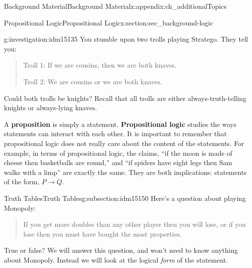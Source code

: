 \documentclass[oneside,10pt,]{book}
\newcommand{\terminology}[1]{\textbf{#1}}
\numberwithin{equation}{chapter}
\def\imp{\rightarrow}
\begin{document}
\begin{appendixptx}{Background Material}{}{Background Material}{}{}{x:appendix:ch_additionalTopics}
\typeout{************************************************}
%
\begin{sectionptx}{Propositional Logic}{}{Propositional Logic}{}{}{x:section:sec_background-logic}
\begin{introduction}{}%
\begin{investigation}{}{g:investigation:idm15135}%
You stumble upon two trolls playing Stratego\textregistered{}.  They tell you:%
\begin{quote}%
Troll 1: If we are cousins, then we are both knaves.%
\par
Troll 2: We are cousins or we are both knaves.%
\end{quote}
Could both trolls be knights?  Recall that all trolls are either always-truth-telling knights or always-lying knaves.%
\end{investigation}
A \terminology{proposition} is simply a statement. \terminology{Propositional logic} studies the ways statements can interact with each other. It is important to remember that propositional logic does not really care about the content of the statements. For example, in terms of propositional logic, the claims, ``if the moon is made of cheese then basketballs are round,'' and ``if spiders have eight legs then Sam walks with a limp'' are exactly the same. They are both implications: statements of the form, \(P \imp Q\).%
\end{introduction}%
%
%
\typeout{************************************************}
\typeout{************************************************}
%
\begin{subsectionptx}{Truth Tables}{}{Truth Tables}{}{}{g:subsection:idm15150}
%
Here's a question about playing Monopoly:%
\begin{quote}%
If you get more doubles than any other player then you will lose, or if you lose then you must have bought the most properties.%
\end{quote}
True or false? We will answer this question, and won't need to know anything about Monopoly. Instead we will look at the logical \emph{form} of the statement.%
\par

\end{subsectionptx}
\end{sectionptx}
\end{appendixptx}
\end{document}
